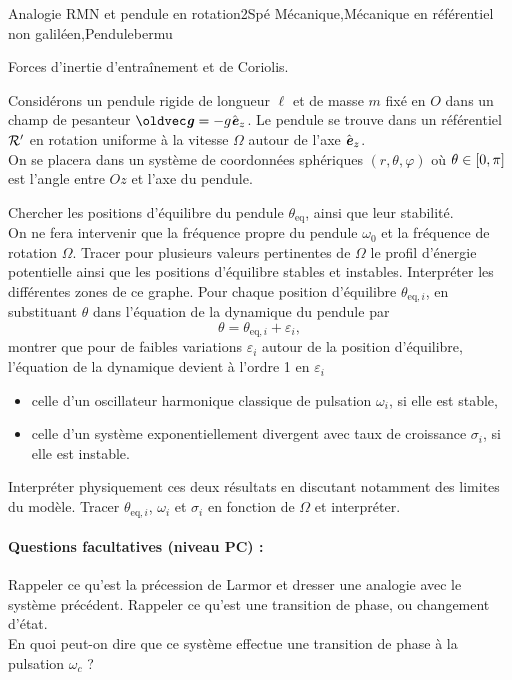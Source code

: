 
\begin{exercise}{Analogie RMN et pendule en rotation}{2}{Spé}
{Mécanique,Mécanique en référentiel non galiléen,Pendule}{bermu}

\begin{questions}
    \questioncours Forces d'inertie d'entraînement et de Coriolis.
\begin{EnvUplevel}
Considérons un pendule rigide de longueur $\ell$ et de masse $m$ fixé en $O$ dans un champ de pesanteur $\vg = -g\ve_z$. Le pendule se trouve dans un référentiel $\cal{R}'$ en rotation uniforme à la vitesse $\Omega$ autour de l'axe $\ve_z$. \\
On se placera dans un système de coordonnées sphériques $(r,\theta,\varphi)$ où $\theta\in\qty[0,\pi]$ est l'angle entre $Oz$ et l'axe du pendule.
\end{EnvUplevel}
    \question Chercher les positions d'équilibre du pendule $\theta_\text{eq}$, ainsi que leur stabilité. \\
    On ne fera intervenir que la fréquence propre du pendule $\omega_0$ et la fréquence de rotation $\Omega$.
    \question Tracer pour plusieurs valeurs pertinentes de $\Omega$ le profil d'énergie potentielle ainsi que les positions d'équilibre stables et instables. Interpréter les différentes zones de ce graphe.
    \question Pour chaque position d'équilibre $\theta_{\text{eq}, i}$, en substituant $\theta$ dans l'équation de la dynamique du pendule par
    $$\theta = \theta_{\text{eq}, i} + \varepsilon_i,$$
    montrer que pour de faibles variations $\varepsilon_i$ autour de la position d'équilibre, l'équation de la dynamique devient à l'ordre 1 en $\varepsilon_i$
    \begin{itemize}
        \item celle d'un oscillateur harmonique classique de pulsation $\omega_i$, si elle est stable,
        \item celle d'un système exponentiellement divergent avec taux de croissance $\sigma_i$, si elle est instable.
    \end{itemize}
    Interpréter physiquement ces deux résultats en discutant notamment des limites du modèle.
    Tracer $\theta_{\text{eq}, i}$, $\omega_i$ et $\sigma_i$ en fonction de $\Omega$ et interpréter.
\end{questions}
\paragraph{Questions facultatives (niveau PC) :}
\begin{questions}
    \question Rappeler ce qu'est la précession de Larmor et dresser une analogie avec le système précédent.
    \question Rappeler ce qu'est une transition de phase, ou changement d'état. \\
    En quoi peut-on dire que ce système effectue une transition de phase à la pulsation $\omega_c$ ?
\end{questions}

\end{exercise}